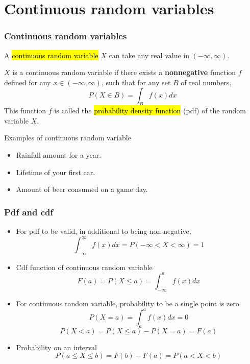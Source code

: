 \documentclass[slidestop,compress,mathserif]{beamer}
\begin{document}
\section{Continuous random variables}
\begin{frame}\frametitle{Continuous random variables}

\begin{dinglist}{\DingListSymbolA}
\item A \hl{continuous random variable} $X$ can take any real value in $(-\infty, \infty)$.
\end{dinglist}
\pause
\begin{defn}
$X$ is a continuous random variable if there exists a {\bf nonnegative} function $f$
defined for any $x \in (-\infty, \infty)$, such that for any set $B$ of real numbers,
\[ P(X \in B) = \int_B f(x) dx \]
This function $f$ is called the \hl{probability density function} (pdf) of the random variable $X$.
\end{defn}

\vspace{0.5cm}

\pause
Examples of continuous random variable
\begin{itemize}
\item Rainfall amount for a year.\\
\item Lifetime of your first car. \\
\item Amount of beer consumed on a game day.
\end{itemize}

\end{frame}

\begin{frame}\frametitle{Pdf and cdf}

\begin{itemize}

\item  For pdf to be valid, in additional to being non-negative,
\[  \int_{-\infty}^{\infty} f(x) dx = P(-\infty < X < \infty) =  1\] \pause

\item Cdf function of continuous random variable
\[ F(a) = P(X \leq a) =  \int_{-\infty}^{a} f(x) dx \]
\pause\vspace{-0.5cm}

\item  For continuous random variable, probability to be a single point is zero.
\[ P(X = a) =   \int_{a}^{a} f(x) dx = 0\]
\[ P(X < a) = P(X \leq a) - P(X = a) = F(a) \]
\pause\vspace{-0.5cm}

\item Probability on an interval
\[ P( a \leq X \leq b) =  F(b) - F(a) = P(a < X < b)\]


\end{itemize}

\end{frame}
\end{document}
